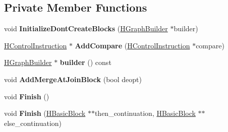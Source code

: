 \subsection*{Private Member Functions}
\begin{DoxyCompactItemize}
\item 
void {\bfseries Initialize\+Dont\+Create\+Blocks} (\hyperlink{classv8_1_1internal_1_1_h_graph_builder}{H\+Graph\+Builder} $\ast$builder)\hypertarget{classv8_1_1internal_1_1_h_graph_builder_1_1_if_builder_a426a7dd4fc76e7e543b9d1359f499024}{}\label{classv8_1_1internal_1_1_h_graph_builder_1_1_if_builder_a426a7dd4fc76e7e543b9d1359f499024}

\item 
\hyperlink{classv8_1_1internal_1_1_h_control_instruction}{H\+Control\+Instruction} $\ast$ {\bfseries Add\+Compare} (\hyperlink{classv8_1_1internal_1_1_h_control_instruction}{H\+Control\+Instruction} $\ast$compare)\hypertarget{classv8_1_1internal_1_1_h_graph_builder_1_1_if_builder_ab50d0c3fc68a3adae191846e31a5ef37}{}\label{classv8_1_1internal_1_1_h_graph_builder_1_1_if_builder_ab50d0c3fc68a3adae191846e31a5ef37}

\item 
\hyperlink{classv8_1_1internal_1_1_h_graph_builder}{H\+Graph\+Builder} $\ast$ {\bfseries builder} () const \hypertarget{classv8_1_1internal_1_1_h_graph_builder_1_1_if_builder_ad44d4515726464ae6b94c2174ec45c1e}{}\label{classv8_1_1internal_1_1_h_graph_builder_1_1_if_builder_ad44d4515726464ae6b94c2174ec45c1e}

\item 
void {\bfseries Add\+Merge\+At\+Join\+Block} (bool deopt)\hypertarget{classv8_1_1internal_1_1_h_graph_builder_1_1_if_builder_a35c0efbbe9f451e42363cb4adf0a5c12}{}\label{classv8_1_1internal_1_1_h_graph_builder_1_1_if_builder_a35c0efbbe9f451e42363cb4adf0a5c12}

\item 
void {\bfseries Finish} ()\hypertarget{classv8_1_1internal_1_1_h_graph_builder_1_1_if_builder_a6fb9487cca65331cdae394d7a63ba7a4}{}\label{classv8_1_1internal_1_1_h_graph_builder_1_1_if_builder_a6fb9487cca65331cdae394d7a63ba7a4}

\item 
void {\bfseries Finish} (\hyperlink{classv8_1_1internal_1_1_h_basic_block}{H\+Basic\+Block} $\ast$$\ast$then\+\_\+continuation, \hyperlink{classv8_1_1internal_1_1_h_basic_block}{H\+Basic\+Block} $\ast$$\ast$else\+\_\+continuation)\hypertarget{classv8_1_1internal_1_1_h_graph_builder_1_1_if_builder_ad20ead08e56d7471796cd3691fa80e9a}{}\label{classv8_1_1internal_1_1_h_graph_builder_1_1_if_builder_ad20ead08e56d7471796cd3691fa80e9a}

\end{DoxyCompactItemize}
